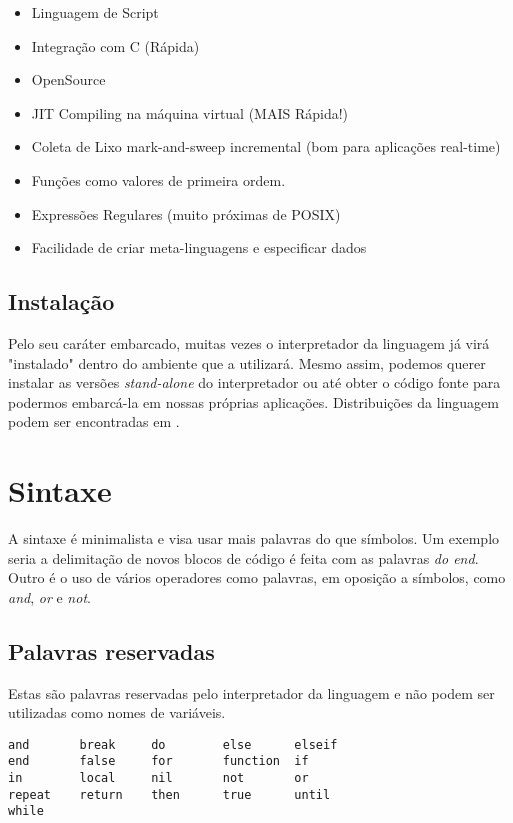 \documentclass[a4paper,12pt]{abnt}
\begin{document}
\begin{itemize}
\item Linguagem de Script
\item Integração com C (Rápida)
\item OpenSource
\item JIT Compiling na máquina virtual (MAIS Rápida!)
\item Coleta de Lixo mark-and-sweep incremental (bom para aplicações real-time)
\item Funções como valores de primeira ordem.
\item Expressões Regulares (muito próximas de POSIX)
\item Facilidade de criar meta-linguagens e especificar dados

\end{itemize}

\section{Instalação}

Pelo seu caráter embarcado, muitas vezes o interpretador da linguagem já virá
"instalado" dentro do ambiente que a utilizará. Mesmo assim, podemos querer
instalar as versões \emph{stand-alone} do interpretador ou até obter o código
fonte para podermos embarcá-la em nossas próprias aplicações. Distribuições da
linguagem podem ser encontradas em \cite{luaorg}.

\chapter{Sintaxe}

A sintaxe é minimalista e visa usar mais palavras do que símbolos.
Um exemplo seria a delimitação de novos blocos de código é
feita com as palavras \emph{do end}. Outro é o uso de vários operadores como
palavras, em oposição a símbolos, como  \emph{and}, \emph{or} e \emph{not}.

\section{Palavras reservadas}

Estas são palavras reservadas pelo interpretador da linguagem e não podem ser
utilizadas como nomes de variáveis.

\begin{lstlisting}
and       break     do        else      elseif
end       false     for       function  if
in        local     nil       not       or
repeat    return    then      true      until
while
\end{lstlisting}
\end{document}
